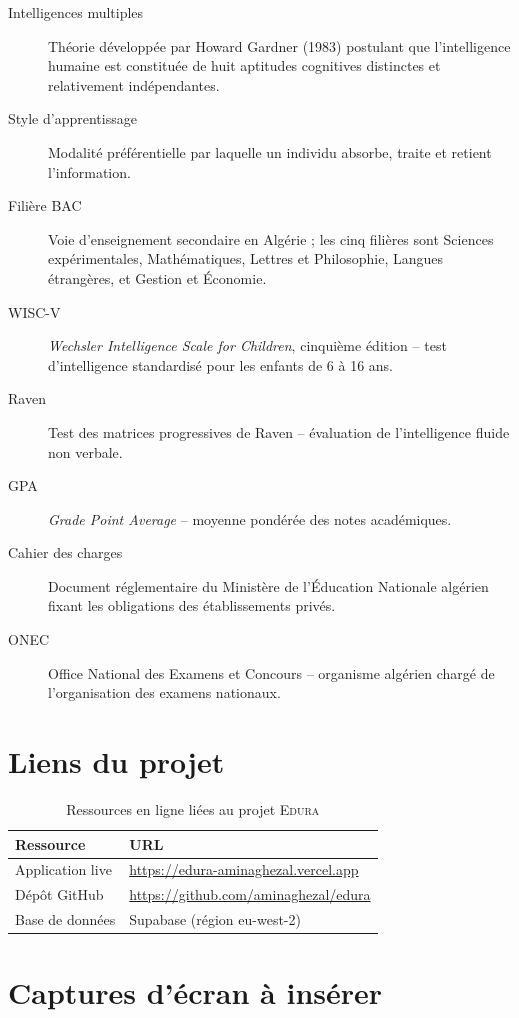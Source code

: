\documentclass[12pt,a4paper,oneside]{report}
\newcommand{\edura}{\textsc{Edura}}
\begin{document}
\begin{description}
  \item[Intelligences multiples] Théorie développée par Howard Gardner (1983) postulant que l'intelligence humaine est constituée de huit aptitudes cognitives distinctes et relativement indépendantes.
  \item[Style d'apprentissage] Modalité préférentielle par laquelle un individu absorbe, traite et retient l'information.
  \item[Filière BAC] Voie d'enseignement secondaire en Algérie ; les cinq filières sont Sciences expérimentales, Mathématiques, Lettres et Philosophie, Langues étrangères, et Gestion et Économie.
  \item[WISC-V] \textit{Wechsler Intelligence Scale for Children}, cinquième édition -- test d'intelligence standardisé pour les enfants de 6 à 16 ans.
  \item[Raven] Test des matrices progressives de Raven -- évaluation de l'intelligence fluide non verbale.
  \item[GPA] \textit{Grade Point Average} -- moyenne pondérée des notes académiques.
  \item[Cahier des charges] Document réglementaire du Ministère de l'Éducation Nationale algérien fixant les obligations des établissements privés.
  \item[ONEC] Office National des Examens et Concours -- organisme algérien chargé de l'organisation des examens nationaux.
\end{description}

\chapter{Liens du projet}

\begin{table}[H]
\centering
\caption{Ressources en ligne liées au projet \edura{}}
\begin{tabular}{ll}
\toprule
\textbf{Ressource} & \textbf{URL} \\
\midrule
Application live & \url{https://edura-aminaghezal.vercel.app} \\
Dépôt GitHub & \url{https://github.com/aminaghezal/edura} \\
Base de données & Supabase (région eu-west-2) \\
\bottomrule
\end{tabular}
\end{table}

\chapter{Captures d'écran à insérer}
\end{document}
